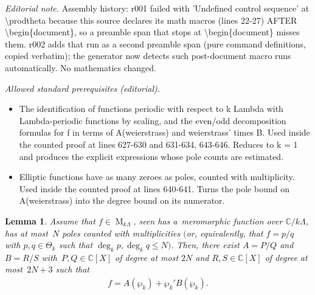 \documentclass[10pt,a4paper]{amsart}
\numberwithin{equation}{section}
\newtheorem{Lemma}[Theorem]{Lemma}
\newcommand{\degr}[1]{\deg_{#1}}
\newcommand{\wpf}[1]{\wp_{#1}}
\newcommand{\prodtheta}[1]{\Theta_{#1}}
\begin{document}
\noindent\textit{Editorial note.} Assembly history: r001 failed with 'Undefined control sequence' at \textbackslash{}prodtheta because this source declares its math macros (lines 22-27) AFTER \textbackslash{}begin\{document\}, so a preamble span that stops at \textbackslash{}begin\{document\} misses them. r002 adds that run as a second preamble span (pure command definitions, copied verbatim); the generator now detects such post-document macro runs automatically. No mathematics changed.\par\medskip
\noindent\textit{Allowed standard prerequisites (editorial).}\begin{itemize}
\item The identification of functions periodic with respect to k Lambda with Lambda-periodic functions by scaling, and the even/odd decomposition formulas for f in terms of A(weierstrass) and weierstrass' times B. Used inside the counted proof at lines 627-630 and 631-634, 643-646. Reduces to k = 1 and produces the explicit expressions whose pole counts are estimated.
\item Elliptic functions have as many zeroes as poles, counted with multiplicity. Used inside the counted proof at lines 640-641. Turns the pole bound on A(weierstrass) into the degree bound on its numerator.
\end{itemize}\medskip
\begin{Lemma}
\label{lem2}
Assume that $f \in \operatorname{M}_{k\Lambda}$, seen has a~meromorphic function over $\mathbb C/k\Lambda$, has at
most~$N$ poles counted with multiplicities $($or, equivalently, that $f=p/q$ with $p,q \in \prodtheta{k}$ such that
${\degr{k} p, \degr{k} q \leq N})$.
Then, there exist $A=P/Q$ and $B=R/S$ with~$P,Q \in \mathbb C[X]$ of degree at most $2N$ and $R,S \in \mathbb C[X]$ of
degree at most~$2N+3$ such that
\begin{gather*}
f=A(\wpf{k})+\wpf{k}' B(\wpf{k}).
\end{gather*}
\end{Lemma}
\end{document}
